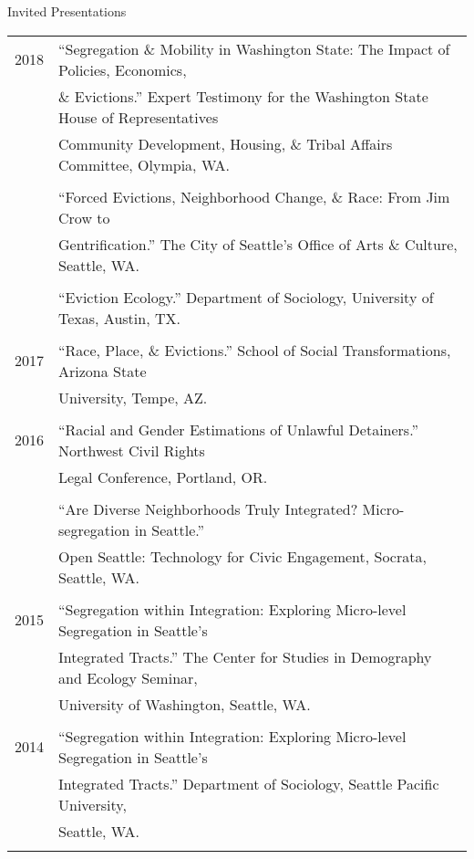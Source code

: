 \documentclass{resume} %
\begin{document}
\begin{rSection}{Invited Presentations}
\begin{tabular}{ @{} >{}l @{\hspace{6ex}} l }
2018 	& ``Segregation \& Mobility in Washington State: The Impact of Policies, Economics,\\
		& \& Evictions.'' Expert Testimony for the Washington State House of Representatives\\
		& Community Development, Housing, \& Tribal Affairs Committee, Olympia, WA.\\\\

	 	& ``Forced Evictions, Neighborhood Change, \& Race: From Jim Crow to\\
		& Gentrification.'' The City of Seattle's Office of Arts \& Culture, Seattle, WA.\\\\

	 	& ``Eviction Ecology.'' Department of Sociology, University of Texas, Austin, TX.\\\\

2017 	& ``Race, Place, \& Evictions.'' School of Social Transformations, Arizona State \\
		& University, Tempe, AZ.\\\\

2016 	& ``Racial and Gender Estimations of Unlawful Detainers.'' Northwest Civil Rights\\
		& Legal Conference, Portland, OR.\\\\

	 	& ``Are Diverse Neighborhoods Truly Integrated? Micro-segregation in Seattle.''\\
		& Open Seattle: Technology for Civic Engagement, Socrata, Seattle, WA.\\\\

2015	& ``Segregation within Integration: Exploring Micro-level Segregation in Seattle’s\\
		& Integrated Tracts.'' The Center for Studies in Demography and Ecology Seminar,\\
		& University of Washington, Seattle, WA.\\\\

2014	& ``Segregation within Integration: Exploring Micro-level Segregation in Seattle’s\\
		& Integrated Tracts.'' Department of Sociology, Seattle Pacific University, \\
		& Seattle, WA.\\\\
\end{tabular}


\end{rSection}
\end{document}
